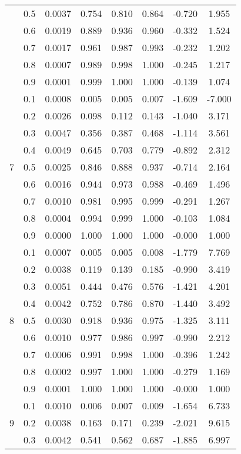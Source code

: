 \documentclass[11pt,a4paper]{report}
\begin{document}
\begin{longtable}{ | c | c || c | c | c | c | c | c | }
 & 0.5 & 0.0037 & 0.754 & 0.810 & 0.864 & -0.720 & 1.955 \\
 & 0.6 & 0.0019 & 0.889 & 0.936 & 0.960 & -0.332 & 1.524 \\
 & 0.7 & 0.0017 & 0.961 & 0.987 & 0.993 & -0.232 & 1.202 \\
 & 0.8 & 0.0007 & 0.989 & 0.998 & 1.000 & -0.245 & 1.217 \\
 & 0.9 & 0.0001 & 0.999 & 1.000 & 1.000 & -0.139 & 1.074 \\
 \hline
\multirow{9}{*}{7} & 0.1 & 0.0008 & 0.005 & 0.005 & 0.007 & -1.609 & -7.000 \\
 & 0.2 & 0.0026 & 0.098 & 0.112 & 0.143 & -1.040 & 3.171 \\
 & 0.3 & 0.0047 & 0.356 & 0.387 & 0.468 & -1.114 & 3.561 \\
 & 0.4 & 0.0049 & 0.645 & 0.703 & 0.779 & -0.892 & 2.312 \\
 & 0.5 & 0.0025 & 0.846 & 0.888 & 0.937 & -0.714 & 2.164 \\
 & 0.6 & 0.0016 & 0.944 & 0.973 & 0.988 & -0.469 & 1.496 \\
 & 0.7 & 0.0010 & 0.981 & 0.995 & 0.999 & -0.291 & 1.267 \\
 & 0.8 & 0.0004 & 0.994 & 0.999 & 1.000 & -0.103 & 1.084 \\
 & 0.9 & 0.0000 & 1.000 & 1.000 & 1.000 & -0.000 & 1.000 \\
 \hline
\multirow{9}{*}{8} & 0.1 & 0.0007 & 0.005 & 0.005 & 0.008 & -1.779 & 7.769 \\
 & 0.2 & 0.0038 & 0.119 & 0.139 & 0.185 & -0.990 & 3.419 \\
 & 0.3 & 0.0051 & 0.444 & 0.476 & 0.576 & -1.421 & 4.201 \\
 & 0.4 & 0.0042 & 0.752 & 0.786 & 0.870 & -1.440 & 3.492 \\
 & 0.5 & 0.0030 & 0.918 & 0.936 & 0.975 & -1.325 & 3.111 \\
 & 0.6 & 0.0010 & 0.977 & 0.986 & 0.997 & -0.990 & 2.212 \\
 & 0.7 & 0.0006 & 0.991 & 0.998 & 1.000 & -0.396 & 1.242 \\
 & 0.8 & 0.0002 & 0.997 & 1.000 & 1.000 & -0.279 & 1.169 \\
 & 0.9 & 0.0001 & 1.000 & 1.000 & 1.000 & -0.000 & 1.000 \\
 \hline
\multirow{9}{*}{9} & 0.1 & 0.0010 & 0.006 & 0.007 & 0.009 & -1.654 & 6.733 \\
 & 0.2 & 0.0038 & 0.163 & 0.171 & 0.239 & -2.021 & 9.615 \\
 & 0.3 & 0.0042 & 0.541 & 0.562 & 0.687 & -1.885 & 6.997 \\

\end{longtable}
\end{document}
